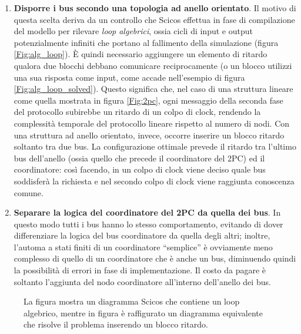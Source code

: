\begin{enumerate}
\item \textbf{Disporre i bus secondo una topologia ad anello orientato}. Il motivo di questa scelta deriva da un controllo che Scicos effettua in fase di compilazione del modello per rilevare \textsl{loop algebrici}, ossia cicli di input e output potenzialmente infiniti che portano al fallimento della simulazione (figura \ref{Fig:alg_loop}). È quindi necessario aggiungere un elemento di ritardo qualora due blocchi debbano comunicare reciprocamente (o un blocco utilizzi una sua risposta come input, come accade nell'esempio di figura \ref{Fig:alg_loop_solved}). Questo significa che, nel caso di una struttura lineare come quella mostrata in figura \ref{Fig:2pc}, ogni messaggio della seconda fase del protocollo subirebbe un ritardo di un colpo di clock, rendendo la complessità temporale del protocollo lineare rispetto al numero di nodi. Con una struttura ad anello orientato, invece, occorre inserire un blocco ritardo soltanto tra due bus. La configurazione ottimale prevede il ritardo tra l'ultimo bus dell'anello (ossia quello che precede il coordinatore del 2PC) ed il coordinatore: così facendo, in un colpo di clock viene deciso quale bus soddisferà la richiesta e nel secondo colpo di clock viene raggiunta conoscenza comune.
\item \textbf{Separare la logica del coordinatore del 2PC da quella dei bus}. In questo modo tutti i bus hanno lo stesso comportamento, evitando di dover differenziare la logica del bus coordinatore da quella degli altri; inoltre, l'automa a stati finiti di un coordinatore \textquotedblleft semplice\textquotedblright{} è ovviamente meno complesso di quello di un coordinatore che è anche un bus, diminuendo quindi la possibilità di errori in fase di implementazione. Il costo da pagare è soltanto l'aggiunta del nodo coordinatore all'interno dell'anello dei bus.
\end{enumerate}

\begin{figure}
\caption{La figura  mostra un diagramma Scicos che contiene un loop algebrico, mentre in figura  è raffigurato un diagramma equivalente che risolve il problema inserendo un blocco ritardo.}
\label{Fig:loops}
\end{figure}

